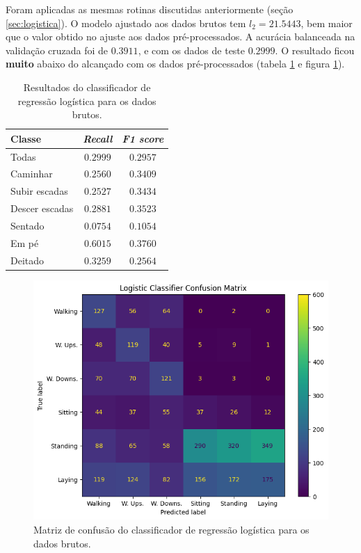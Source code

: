\documentclass[final,5p]{elsarticle}
\numberwithin{equation}{section}
\begin{document}
        Foram aplicadas as mesmas rotinas discutidas anteriormente (seção \ref{sec:logistica}). O modelo ajustado aos dados brutos tem $l_2 = 21.5443$, bem maior que o valor obtido no ajuste aos dados pré-processados. A acurácia balanceada na validação cruzada foi de $0.3911$, e com os dados de teste $0.2999$. O resultado ficou \textbf{muito} abaixo do alcançado com os dados pré-processados (tabela \ref{tab:resultados_logistico_brutos} e figura \ref{fig:cm_logistico_brutos}).

        \begin{table}[h]
            \centering
            \begin{tabular}{l c c}
                \toprule
                \textbf{Classe} & \textbf{\emph{Recall}}  & \textbf{\emph{F1 score}} \\
                \midrule
                Todas & $0.2999$ & $0.2957$ \\
                \addlinespace
                Caminhar   & $0.2560$ & $0.3409$ \\
                Subir escadas   & $0.2527$ & $0.3434$ \\
                Descer escadas & $0.2881$ & $0.3523$ \\
                Sentado   & $0.0754$ & $0.1054$ \\
                Em pé  & $0.6015$ & $0.3760$ \\
                Deitado    & $0.3259$ & $0.2564$ \\
                \bottomrule
            \end{tabular}
            \caption{Resultados do classificador de regressão logística para os dados brutos.}
            \label{tab:resultados_logistico_brutos}
        \end{table}

        \begin{figure}[hbt!]
            \includegraphics[width=0.95\columnwidth]{B_Logistic_CM.png}
            \caption{Matriz de confusão do classificador de regressão logística para os dados brutos.}
            \label{fig:cm_logistico_brutos}
        \end{figure}
\end{document}

